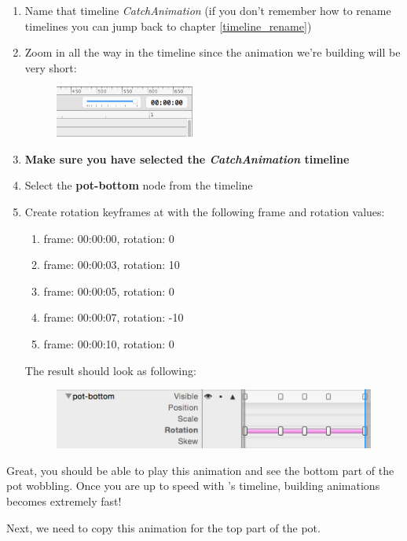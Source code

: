 \begin{leftbar}
\begin{enumerate}
  \item Name that timeline \textit{CatchAnimation} (if you don't remember how
  to rename timelines you can jump back to chapter \ref{timeline_rename})
  \item Zoom in all the way in the timeline since the animation we're building
  will be very short:
  \begin{figure}[H]
  \centering
  \includegraphics[width=130pt]{images/Chapter9/zoom_timeline.png}
  \end{figure}
  \item \textbf{Make sure you have selected the \textit{CatchAnimation}
  timeline}
  \item Select the \textbf{pot-bottom} node from the timeline
  \item Create rotation keyframes at with the following frame and rotation
  values:
  \begin{enumerate}
    \item frame: 00:00:00, rotation: 0
    \item frame: 00:00:03, rotation: 10
    \item frame: 00:00:05, rotation: 0
    \item frame: 00:00:07, rotation: -10 
    \item frame: 00:00:10, rotation: 0
  \end{enumerate}
  The result should look as following:
  \begin{figure}[H]
  \centering
  \includegraphics[width=300pt]{images/Chapter9/wobble_timeline.png}
  \end{figure}
\end{enumerate}
\end{leftbar}
 
Great, you should be able to play this animation and see the bottom part of the
pot wobbling. Once you are up to speed with \SB{}'s timeline, building
animations becomes extremely fast! 

Next, we need to copy this animation for the top part of the pot.

